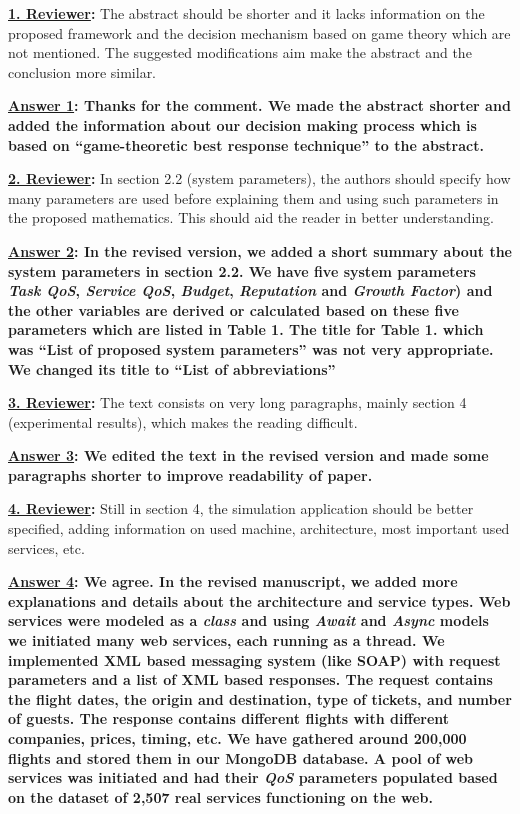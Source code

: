 \documentclass[times, 12pt,a4paper]{article}
\begin{document}
\vspace{0.5cm} \textbf{\underline{1. Reviewer}:} The abstract should be shorter and it lacks information on the proposed framework and the decision mechanism based on game theory which are not mentioned. The suggested modifications aim make the abstract and the conclusion more similar.

\vspace{0.2cm}\textbf{\underline{Answer 1}: Thanks for the
comment. We made the abstract shorter and added the information about our decision making process which is based on ``game-theoretic best response technique'' to the abstract.}

\vspace{0.5cm}\textbf{\underline{2. Reviewer}:}  In section 2.2 (system parameters), the authors should specify how many parameters are used before explaining them and using such parameters in the proposed mathematics. This should aid the reader in better understanding.

\vspace{0.2cm}\textbf{\underline{Answer 2}: In the revised version, we added a short summary about the system parameters in section 2.2. We have five system parameters \emph{Task QoS}, \emph{Service QoS}, \emph{Budget}, \emph{Reputation} and \emph{Growth Factor}) and the other variables are derived or calculated based on these five parameters which are listed in Table 1. The title for Table 1. which was ``List of proposed system parameters'' was not very appropriate. We changed its title to ``List of abbreviations''}


\vspace{0.5cm}\textbf{\underline{3. Reviewer}:} The text consists on very long paragraphs, mainly section 4 (experimental results), which makes the reading difficult.

\vspace{0.2cm}\textbf{\underline{Answer 3}: We edited the text in the revised version and made some paragraphs shorter to improve readability of paper.}


\vspace{0.5cm}\textbf{\underline{4. Reviewer}:} Still in section 4, the simulation application should be better specified, adding information on used machine, architecture, most important used services, etc.

\vspace{0.2cm}\textbf{\underline{Answer 4}: We agree. In the revised manuscript, we added more explanations and details about the architecture and service types. Web services were modeled as a \emph{class} and using \emph{Await} and \emph{Async} models we initiated many web services, each running as a thread. We implemented XML based messaging system (like SOAP) with request parameters and a list of XML based responses. The request
contains the flight dates, the origin and destination, type of tickets, and number of guests. The response contains different flights with different companies, prices, timing, etc. We have gathered around 200,000 flights and stored them in our MongoDB database. A pool of web services was initiated and had their \emph{QoS} parameters populated based on the dataset of 2,507 real services functioning on the web.
}
\end{document}
